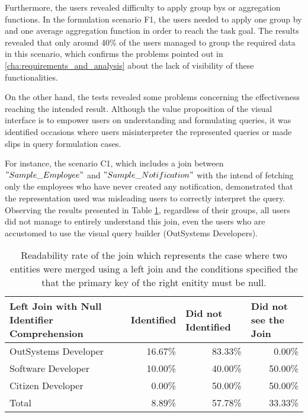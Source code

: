 Furthermore, the users revealed difficulty to apply group bys or aggregation functions. In the formulation scenario F1, the users needed to apply one group by and one average aggregation function in order to reach the task goal. The results revealed that only around 40\% of the users managed to group the required data in this scenario, which confirms the problems pointed out in \ref{cha:requirements_and_analysis} about the lack of visibility of these functionalities.

On the other hand, the tests revealed some problems concerning the effectiveness reaching the intended result. Although the value proposition of the visual interface is to empower users on understanding and formulating queries, it was identified occasions where users misinterpreter the represented queries or made slips in query formulation cases.

For instance, the scenario C1, which includes a join between $"Sample\_Employee"$ and $"Sample\_Notification"$ with the intend of fetching only the employees who have never created any notification, demonstrated that the representation used was misleading users to correctly interpret the query. Observing the results presented in Table \ref{tab:existingInterfaceLeftJoinNull}, regardless of their groups, all users did not manage to entirely understand this join, even the users who are accustomed to use the visual query builder (OutSystems Developers).

\begin{table}[tb]
    \caption{Readability rate of the join which represents the case where two entities were merged using a left join and the conditions specified the that the primary key of the right enitity must be null.}
    \label{tab:existingInterfaceLeftJoinNull}
    \begin{tabular}{@{}m{5.4cm}rrr@{}}
    \toprule
    \textbf{Left Join with Null Identifier Comprehension} & \multicolumn{1}{l}{Identified} & \multicolumn{1}{l}{Did not Identified} & \multicolumn{1}{l}{Did not see the Join} \\ \midrule
    OutSystems Developer                                  & 16.67\%                        & 83.33\%                                & 0.00\%                                   \\
    Software Developer                                    & 10.00\%                        & 40.00\%                                & 50.00\%                                  \\
    Citizen Developer                                     & 0.00\%                         & 50.00\%                                & 50.00\%                                  \\
    Total                                                 & 8.89\%                         & 57.78\%                                & 33.33\%                                  \\ \bottomrule
    \end{tabular}
    \end{table}


